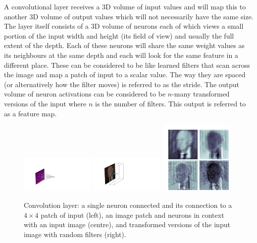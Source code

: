 A convolutional layer receives a 3D volume of input values and will map this to another 3D volume of output values which will not necessarily have the same size. 
The layer itself consists of a 3D volume of neurons each of which views a small portion of the input width and height (its field of view) and usually the full extent of the depth. 
Each of these neurons will share the same weight values as its neighbours at the same depth and each will look for the same feature in a different place. 
These can be considered to be like learned filters that scan across the image and map a patch of input to a scalar value. The way they are spaced (or alternatively how the filter moves) is referred to as the stride. 
The output volume of neuron activations can be considered to be $n$-many transformed versions of the input where $n$ is the number of filters. This output is referred to as a feature map. 
\begin{figure}[h!]
    \begin{center}
        \includegraphics[width=0.32\textwidth]{figures/machine_learning/convolution_neuron.pdf}
        \includegraphics[width=0.32\textwidth]{figures/machine_learning/convolution_layer.pdf}
        \includegraphics[width=0.32\textwidth]{figures/machine_learning/convolution_transforms.pdf}
    \end{center}
    \caption{Convolution layer: a single neuron connected and its connection to a $4\times{}4$ patch of input (left), an image patch and neurons in context with an input image \cite{Higgs_photo} (centre), and transformed versions of the input image with random filters (right).}
        \label{fig:machine_learning:convolution}
\end{figure}

